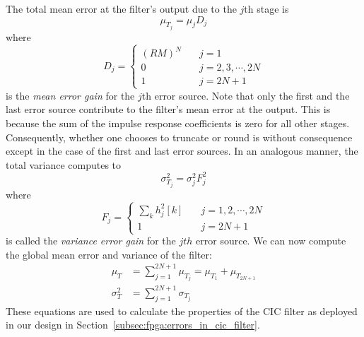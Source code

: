 The total mean error at the filter's output due to the $j$th stage is
\begin{equation}
    \label{eq:cic:truncation_rounding:total_mean_error_jth_stage}
    \mu_{T_j} = \mu_jD_j
\end{equation}
where
\begin{equation}
    \label{eq:cic:truncation_rounding:mean_error_gain}
    D_j = \left\lbrace
        \begin{aligned}
            (RM)^N         & \quad j = 1\\
            0              & \quad j = 2, 3, \cdots, 2N\\
            1              & \quad j = 2N+1
        \end{aligned}
    \right.
\end{equation}
is the \emph{mean  error gain} for the $j$th error  source. Note that only the
first and the last  error source contribute to the filter's  mean error at the
output. This is because  the sum of the impulse response  coefficients is zero
for all other  stages. Consequently, whether one chooses to  truncate or round
is  without  consequence except  in  the  case of  the  first  and last  error
sources. In an analogous manner, the total variance computes to
\begin{equation}
    \label{eq:cic:truncation_rounding:total_variance_jth_stage}
    \sigma_{T_j}^2 = \sigma_j^2F_j^2
\end{equation}
where
\begin{equation}
    \label{eq:cic:truncation_rounding:variance_error_gain}
    F_j = \left\lbrace
        \begin{aligned}
            \sum_k h_j^2[k]  & \quad j = 1, 2, \cdots, 2N\\
            1                & \quad j = 2N+1
        \end{aligned}
    \right.
\end{equation}
is called the  \emph{variance error gain} for the $jth$  error source.  We can
now compute the global mean error and variance of the filter:
\begin{align}
    \label{eq:cic:truncation_rounding:global:mean_error}
    \mu_T &= \sum_{j = 1}^{2N+1} \mu_{T_j} = \mu_{T_1} + \mu_{T_{2N+1}}\\
    \label{eq:cic:truncation_rounding:global:variance}
    \sigma_{T}^2 &= \sum_{j=1}^{2N+1} \sigma_{T_j}
\end{align}
These equations  are used  to calculate  the properties of  the CIC  filter as
deployed in our design in Section~\ref{subsec:fpga:errors_in_cic_filter}.

